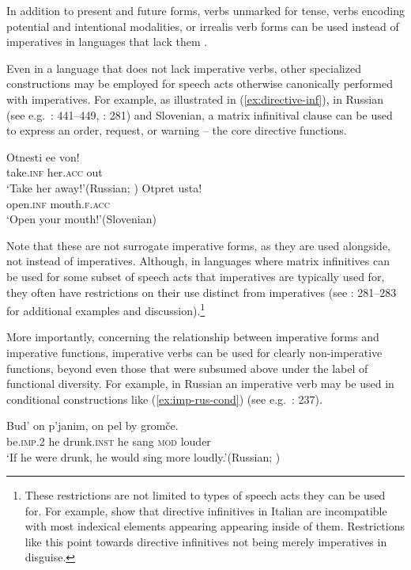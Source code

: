 \documentclass[output=paper,colorlinks,citecolor=brown]{langscibook}
\begin{document}
\noindent In addition to present and future forms, verbs unmarked
for tense, verbs encoding potential and intentional modalities, or irrealis verb forms can be used instead of imperatives in languages that lack them \citep[][38--44]{aikhenvald10}.

Even in a language that does not lack imperative verbs, other specialized constructions may be employed for speech acts otherwise canonically performed with imperatives. For example, as illustrated in (\ref{ex:directive-inf}), in Russian (see e.g.\ \citealt{fortuin01}: 441--449, \citealt{aikhenvald10}: 281) and Slovenian, a matrix infinitival clause can be used to express an order, request, or warning -- the core directive functions.

\ea \label{ex:directive-inf}
\ea\gll Otnesti ee von!\\
     take.\textsc{inf} her.\textsc{acc} out\\
\glt `Take her away!'\hfill (Russian; \citealt[281]{aikhenvald10})
\ex\gll Otpret usta!\\
     open.\textsc{inf} mouth.\textsc{f.acc}\\
\glt `Open your mouth!'\hfill (Slovenian)
\z\z

\noindent Note that these are not surrogate imperative forms, as they are used alongside, not instead of imperatives. Although, in languages where matrix infinitives can be used for some subset of speech acts that imperatives are typically used for, they often have restrictions on their use distinct from imperatives (see \citealt{aikhenvald10}: 281--283 for additional examples and discussion).\footnote{These restrictions are not limited to types of speech acts they can be used for. For example, \citet{zpp24} show that directive infinitives in Italian are incompatible with most indexical elements appearing appearing inside of them. Restrictions like this point towards directive infinitives not being merely imperatives in disguise.}

More importantly, concerning the relationship between imperative forms and imperative functions, imperative verbs can be used for clearly non-imperative functions, beyond even those that were subsumed above under the label of functional diversity. For example, in Russian an imperative verb may be used in conditional constructions like (\ref{ex:imp-rus-cond}) (see e.g.\ \citealt{jakab05,aikhenvald10}: 237). 

\ea \label{ex:imp-rus-cond}
\gll Bud' on p'janim, on pel by grom\v{c}e.\\
     be.\textsc{imp.2} he drunk.\textsc{inst} he sang \textsc{mod} louder\\
\glt `If he were drunk, he would sing more loudly.'\hfill (Russian; \citealt[301]{jakab05})
\z
\end{document}
